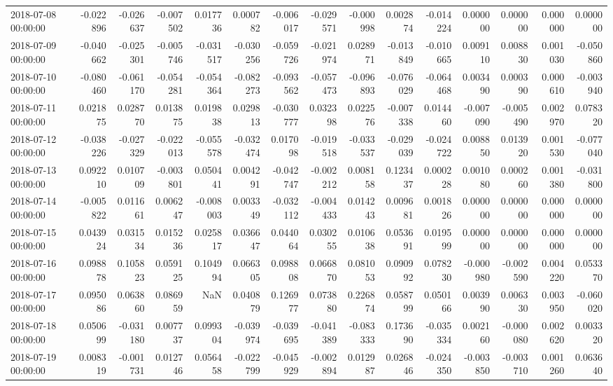 \begin{tabular}{lrrrrrrrrrrrrrr}
2018-07-08 00:00:00 & -0.022896 & -0.026637 & -0.007502 & 0.017736 & 0.000782 & -0.006017 & -0.029571 & -0.000998 & 0.002874 & -0.014224 & 0.000000 & 0.000000 & 0.000000 & 0.000000 \\
2018-07-09 00:00:00 & -0.040662 & -0.025301 & -0.005746 & -0.031517 & -0.030256 & -0.059726 & -0.021974 & 0.028971 & -0.013849 & -0.010665 & 0.009110 & 0.008830 & 0.001030 & -0.050860 \\
2018-07-10 00:00:00 & -0.080460 & -0.061170 & -0.054281 & -0.054364 & -0.082273 & -0.093562 & -0.057473 & -0.096893 & -0.076029 & -0.064468 & 0.003490 & 0.000390 & 0.000610 & -0.003940 \\
2018-07-11 00:00:00 & 0.021875 & 0.028770 & 0.013875 & 0.019838 & 0.029813 & -0.030777 & 0.032398 & 0.022576 & -0.007338 & 0.014460 & -0.007090 & -0.005490 & 0.002970 & 0.078320 \\
2018-07-12 00:00:00 & -0.038226 & -0.027329 & -0.022013 & -0.055578 & -0.032474 & 0.017098 & -0.019518 & -0.033537 & -0.029039 & -0.024722 & 0.008850 & 0.013920 & 0.001530 & -0.077040 \\
2018-07-13 00:00:00 & 0.092210 & 0.010709 & -0.003801 & 0.050441 & 0.004291 & -0.042747 & -0.002212 & 0.008158 & 0.123437 & 0.000228 & 0.001080 & 0.000260 & 0.001380 & -0.031800 \\
2018-07-14 00:00:00 & -0.005822 & 0.011661 & 0.006247 & -0.008003 & 0.003349 & -0.032112 & -0.004433 & 0.014243 & 0.009681 & 0.001826 & 0.000000 & 0.000000 & 0.000000 & 0.000000 \\
2018-07-15 00:00:00 & 0.043924 & 0.031534 & 0.015236 & 0.025817 & 0.036647 & 0.044064 & 0.030255 & 0.010638 & 0.053691 & 0.019599 & 0.000000 & 0.000000 & 0.000000 & 0.000000 \\
2018-07-16 00:00:00 & 0.098878 & 0.105823 & 0.059125 & 0.104994 & 0.066305 & 0.098808 & 0.066870 & 0.081053 & 0.090992 & 0.078230 & -0.000980 & -0.002590 & 0.004220 & 0.053370 \\
2018-07-17 00:00:00 & 0.095086 & 0.063860 & 0.086959 & NaN & 0.040879 & 0.126977 & 0.073880 & 0.226874 & 0.058799 & 0.050166 & 0.003990 & 0.006330 & 0.003950 & -0.060020 \\
2018-07-18 00:00:00 & 0.050699 & -0.031180 & 0.007737 & 0.099304 & -0.039974 & -0.039695 & -0.041389 & -0.083333 & 0.173690 & -0.035334 & 0.002160 & -0.000080 & 0.002620 & 0.003320 \\
2018-07-19 00:00:00 & 0.008319 & -0.001731 & 0.012746 & 0.056458 & -0.022799 & -0.045929 & -0.002894 & 0.012987 & 0.026846 & -0.024350 & -0.003850 & -0.003710 & 0.001260 & 0.063640 \\

\end{tabular}

